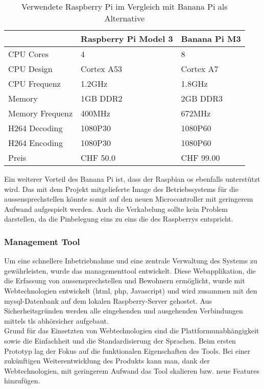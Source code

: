 \begin{table}[]     
	\centering
	\label{microcontrollerComparison}
	\begin{tabular}{l|ll}
		\multicolumn{1}{r|}{} & Raspberry Pi Model 3 & Banana Pi M3 \\ \hline
		CPU Cores             & 4                    & 8            \\ \hline
		CPU Design            & Cortex A53           & Cortex A7    \\ \hline
		CPU Frequenz          & 1.2GHz               & 1.8GHz       \\ \hline
		Memory                & 1GB DDR2             & 2GB DDR3     \\ \hline
		Memory Frequenz       & 400MHz               & 672MHz       \\ \hline
		H264 Decoding         & 1080P30              & 1080P60      \\ \hline
		H264 Encoding         & 1080P30              & 1080P60      \\ \hline
		Preis				  & CHF 50.0             & CHF 99.00    \\ \hline
	\end{tabular}
	\caption{Verwendete Raspberry Pi im Vergleich mit Banana Pi  als Alternative}
	\label{tbl:microcontrollerComparison}
\end{table}
Ein weiterer Vorteil des Banana Pi ist, dass der Raspbian \gls{os} ebenfalls unterstützt wird. Das mit dem Projekt mitgelieferte Image des Betriebssystems für die \gls{aussensprechstelle}n könnte somit auf den neuen Microcontroller mit geringerem Aufwand aufgespielt werden. Auch die Verkabelung sollte  kein Problem darstellen, da die Pinbelegung eins zu eins die des Raspberrys entspricht.
\\
\subsubsection{Management Tool}
\label{kap:managementtool}
Um eine schnellere Inbetriebnahme und eine zentrale Verwaltung des Systems zu gewährleisten, wurde das \gls{managementtool} entwickelt. Diese Webapplikation, die die Erfassung von \gls{aussensprechstelle}n und Bewohnern ermöglicht, wurde mit Webtechnologien entwickelt (\gls{html}, \gls{php}, Javascript) und wird zusammen mit den \gls{mysql}-Datenbank auf dem lokalen Raspberry-Server gehostet. Aus Sicherheitsgründen werden alle eingehenden und ausgehenden Verbindungen mittels \gls{tls} abhörsicher aufgebaut.
\\
Grund für das Einsetzten von Webtechnologien sind die Plattformunabhängigkeit sowie die Einfachheit und die Standardisierung der Sprachen. Beim ersten Prototyp lag der Fokus auf die funktionalen Eigenschaften des Tools. Bei einer zukünftigen Weiterentwicklung des Produkts kann man, dank der Webtechnologien, mit geringerem Aufwand das Tool skalieren bzw. neue Features hinzufügen.
\\

